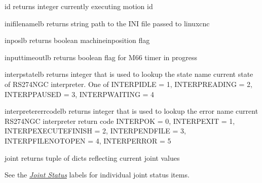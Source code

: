 \documentclass[letterpaper,10pt,english]{sphinxmanual}
\begin{document}
\begin{sphinxVerbatim}[commandchars=\\\{\}]
id \PYGZhy{} returns integer
currently executing motion id

ini\PYGZus{}filename\PYGZus{}lb \PYGZhy{} returns string
path to the INI file passed to linuxcnc

inpos\PYGZus{}lb \PYGZhy{} returns boolean
machine\PYGZhy{}in\PYGZhy{}position flag

input\PYGZus{}timeout\PYGZus{}lb \PYGZhy{} returns boolean
flag for M66 timer in progress

interp\PYGZus{}state\PYGZus{}lb \PYGZhy{} returns integer that is used to lookup the state name
current state of RS274NGC interpreter. One of INTERP\PYGZus{}IDLE = 1,
INTERP\PYGZus{}READING = 2, INTERP\PYGZus{}PAUSED = 3, INTERP\PYGZus{}WAITING = 4

interpreter\PYGZus{}errcode\PYGZus{}lb \PYGZhy{} returns integer that is used to lookup the error name
current RS274NGC interpreter return code
        INTERP\PYGZus{}OK = 0,
        INTERP\PYGZus{}EXIT = 1,
        INTERP\PYGZus{}EXECUTE\PYGZus{}FINISH = 2,
        INTERP\PYGZus{}ENDFILE = 3,
        INTERP\PYGZus{}FILE\PYGZus{}NOT\PYGZus{}OPEN = 4,
        INTERP\PYGZus{}ERROR = 5

joint \PYGZhy{} returns tuple of dicts
reflecting current joint values
\end{sphinxVerbatim}

\sphinxAtStartPar
See the {\hyperref[\detokenize{labels:joint-status-labels}]{\emph{Joint Status}}} labels for individual joint
status items.
\end{document}
